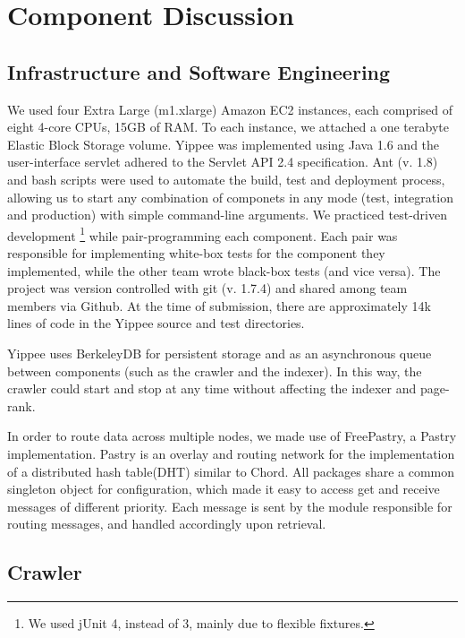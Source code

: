 \documentclass[11pt, letterpaper, oneside, twocolumn]{article}
\begin{document}
\section{Component Discussion}
\label{sec:component}



\subsection{Infrastructure and Software Engineering}

We used four Extra Large (m1.xlarge) Amazon EC2 instances, each comprised of eight 4-core CPUs, 15GB of RAM.
To each instance, we attached a one terabyte Elastic Block Storage volume. 
Yippee was implemented using Java 1.6 and the user-interface servlet adhered to the Servlet API 2.4 specification. 
Ant (v. 1.8) and bash scripts were used to automate the build, test and deployment process, allowing us to start any combination of componets in any mode (test, integration and production) with simple command-line arguments.
We practiced test-driven development \footnote{We used jUnit 4, instead of 3, mainly due to flexible fixtures.} while pair-programming each component.  Each pair was responsible for implementing white-box tests for the component they implemented, while the other team wrote black-box tests (and vice versa). 
The project was version controlled with git (v. 1.7.4) and shared among team members via Github.
At the time of submission, there are approximately 14k lines of code in the Yippee source and test directories.

Yippee uses BerkeleyDB for persistent storage and as an asynchronous queue between components (such as the crawler and the indexer). In this way, the crawler could start and stop at any time without affecting the indexer and page-rank.  

In order to route data across multiple nodes, we made use of FreePastry, a Pastry implementation. 
Pastry is an overlay and routing network for the implementation of a distributed hash table(DHT) similar to Chord. 
All packages share a common singleton object for configuration, which made it easy to access get and receive messages of different priority. 
Each message is sent by the module responsible for routing messages, and handled accordingly upon retrieval.

\subsection{Crawler}
\end{document}
